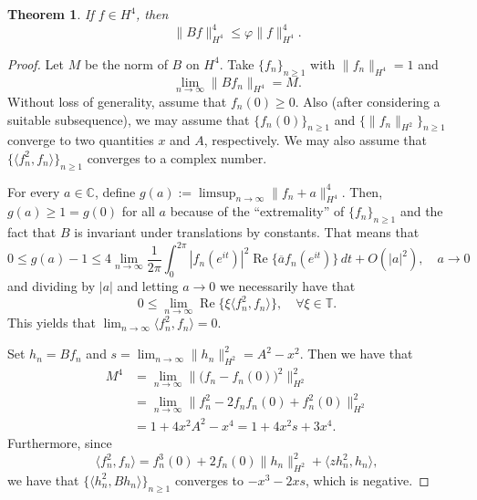 \documentclass{amsart}
\theoremstyle{plain}
\newtheorem{theo}{Theorem}[section]
\theoremstyle{definition}
\newcommand{\C}{\mathbb{C}}
\newcommand{\T}{\mathbb{T}}
\renewcommand{\Re}{\operatorname{Re}}
\begin{document}
        \begin{theo} \label{thm:UpperBound}
            If $f \in H^4$, then
            \[
            \| Bf \|_{H^4}^4 \leq \varphi \| f \|_{H^4}^4.
            \]
        \end{theo}
        
        \begin{proof}
            
            Let $M$ be the norm of $B$ on $H^4$. Take $\{ f_n \}_{n \geq 1}$ with $\| f_n \|_{H^4} = 1$ and
            \[
            \lim_{n \to \infty} \| Bf_n \|_{H^4} = M.
            \]
            Without loss of generality, assume that $f_n(0) \geq 0$. Also (after considering a suitable subsequence), we may assume that $\{ f_n (0) \}_{n \geq 1}$ and $\{ \| f_n \|_{H^2} \}_{n \geq 1}$ converge to two quantities $x$ and $A$, respectively. We may also assume that $\{\langle f_n^2,f_n\rangle\}_{n\geq 1}$ converges to a complex number.
            
            For every $a \in \C$, define $g(a) := \limsup_{n \to \infty} \| f_n + a \|_{H^4}^4$. Then, $g(a) \geq 1 = g(0)$ for all $a$ because of the ``extremality'' of $\{ f_n \}_{n \geq 1}$ and the fact that $B$ is invariant under translations by constants. That means that
            \[
            0 \leq g(a) - 1 \leq 4 \lim_{n \to \infty} \dfrac{1}{2\pi} \int_{0}^{2\pi} |f_n (e^{it})|^2 \Re \{{\overline{a}f_n(e^{it})} \} \, dt + O(|a|^2), \quad a \to 0
            \]
            and dividing by $|a|$ and letting $a \to 0$ we necessarily have that
            \[
            0 \leq \lim_{n \to \infty} \Re \big \{ \xi \langle f_n^2, f_n \rangle \big \}, \quad \forall \xi \in \T.
            \]
            This yields that $\lim_{n \to \infty} \langle f_n^2, f_n \rangle = 0$.
            
            Set $h_n = B f_n$ and $s = \lim_{n \to \infty} \| h_n \|_{H^2}^2 = A^2 - x^2$. Then we have that
            \begin{align}
                M^4 & = \lim_{n \to \infty} \big \| \big( f_n - f_n(0) \big)^2 \big \|_{H^2}^2 \nonumber \\
                & = \lim_{n \to \infty} \| f_n^2 - 2f_n f_n(0) + f_n^2(0)\|_{H^2}^2 \nonumber \\
                & = 1 + 4x^2 A^2 - x^4 = 1 + 4x^2 s + 3x^4. \label{eqn:aux1}
            \end{align}
            Furthermore, since
            \[
            \langle f_n^2, f_n \rangle = f_n^3(0) + 2f_n(0) \| h_n \|_{H^2}^2 + \langle z h_n^2, h_n \rangle,
            \]
            we have that $\{ \langle h_n^2, B h_n \rangle \}_{n \geq 1}$ converges to $-x^3 - 2xs$, which is negative.
            

\end{proof}
\end{document}
